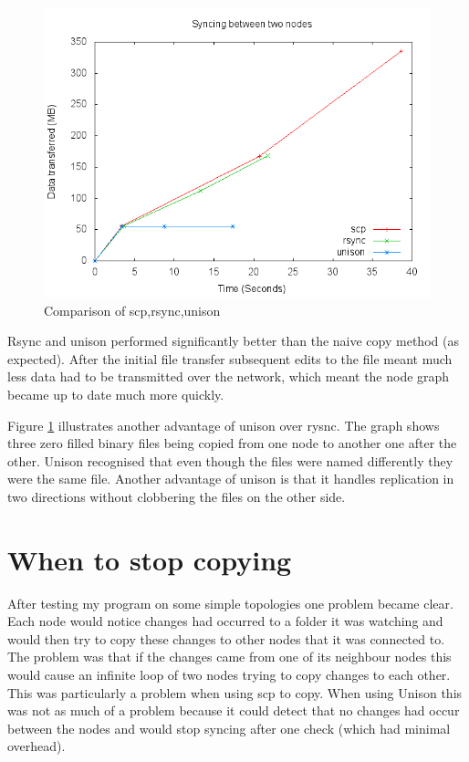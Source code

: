 \documentclass[12pt]{article}
\begin{document}
\begin{figure}[htp]
    \centering
    \includegraphics[scale=0.5]{images/two-point-comp-same.png}
    \caption{Comparison of scp,rsync,unison}
    \label{fig:point_comp_graph}
\end{figure}

Rsync and unison performed significantly better
than the naive copy method (as expected). After the initial file
transfer subsequent edits to the file meant much less data had to
be transmitted over the network, which meant the node graph
became up to date much more quickly.

Figure \ref{fig:point_comp_graph} illustrates another advantage
of unison over rysnc. The graph shows three zero filled
binary files being copied from one node to another one after
the other. Unison recognised that even though the files were named
differently they were the same file. Another advantage of unison
is that it handles replication in two directions without
clobbering the files on the other side.


\section{When to stop copying}
After testing my program on some simple topologies one problem became
clear. Each node would notice changes had occurred to a folder
it was watching and would then try to copy these changes to other
nodes that it was connected to. The problem was that if the changes
came from one of its neighbour nodes this would cause an infinite loop
of two nodes trying to copy changes to each other. This was particularly 
a problem when using scp to copy. When using Unison this was not as much of
a problem because it could detect that no changes had occur between the nodes
and would stop syncing after one check (which had minimal overhead).
\end{document}
